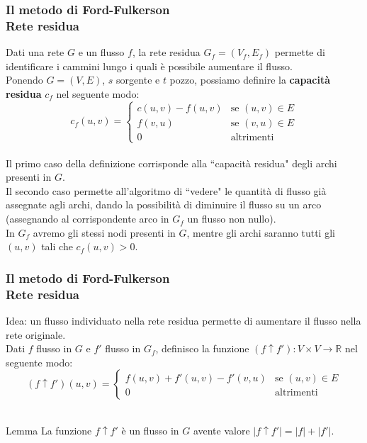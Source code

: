 \documentclass{beamer}
\begin{document}
\begin{frame}
\frametitle{Il metodo di Ford-Fulkerson\\Rete residua}
Dati una rete $G$ e un flusso $f$, la rete residua $G_f=(V_f,E_f)$ permette di identificare i cammini lungo i quali è possibile aumentare il flusso.\\
Ponendo $G=(V,E)$, $s$ sorgente e $t$ pozzo, possiamo definire la \textbf{capacità residua} $c_f$ nel seguente modo:\\
$$c_f(u,v) =
\left\{
	\begin{array}{ll}
		c(u,v)-f(u,v)  & \mbox{se } (u,v)\in E \\
		f(v,u) & \mbox{se } (v,u)\in E \\
		0 & \mbox{altrimenti}
	\end{array}
\right.$$\\
Il primo caso della definizione corrisponde alla ``capacità residua" degli archi presenti in $G$.\\
Il secondo caso permette all'algoritmo di ``vedere" le quantità di flusso già assegnate agli archi, dando la possibilità di diminuire il flusso su un arco (assegnando al corrispondente arco in $G_f$ un flusso non nullo).\\
In $G_f$ avremo gli stessi nodi presenti in $G$, mentre gli archi saranno tutti gli $(u,v)$ tali che $c_f(u,v)>0$.
\end{frame}

\begin{frame}
\frametitle{Il metodo di Ford-Fulkerson\\Rete residua}
Idea: un flusso individuato nella rete residua permette di aumentare il flusso nella rete originale.\\
Dati $f$ flusso in $G$ e $f'$ flusso in $G_f$, definisco la funzione $(f\uparrow f'):V\times V\rightarrow \mathbb{R}$ nel seguente modo:\\
$$(f\uparrow f')(u,v) =
\left\{
	\begin{array}{ll}
		f(u,v)+f'(u,v)-f'(v,u) & \mbox{se } (u,v)\in E \\
		0 & \mbox{altrimenti}
	\end{array}
\right.$$\\
\begin{block}{Lemma}
La funzione $f\uparrow f'$ è un flusso in $G$ avente valore $|f\uparrow f'|=|f|+|f'|$.
\end{block}
\end{frame}
\end{document}
